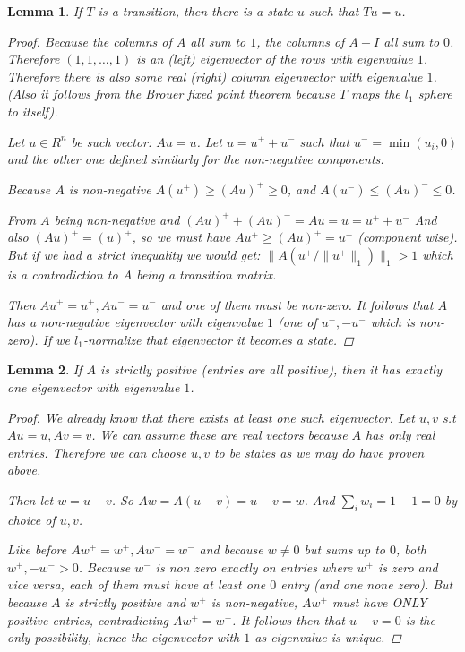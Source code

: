 \documentclass[a4paper,10pt]{article}
\theoremstyle{definition}
\theoremstyle{remark}
\theoremstyle{plain}
\newtheorem{lemma}{Lemma}[section]
\begin{document}
\begin{lemma}
\label{lem:exist1}
If $T$ is a transition, then
there is a state $u$ such that $Tu = u$.
\begin{proof}
Because the columns of $A$ all sum to $1$, the columns of $A-I$ all sum to $0$.
Therefore $(1,1, \dots, 1)$ is an (left) eigenvector of the rows with eigenvalue $1$.
Therefore there is also some real (right) column eigenvector with eigenvalue $1$. 
(Also it follows from the Brouer fixed point theorem because $T$ maps the $l_1$
sphere to itself).

Let $u \in R^n$ be such vector: $Au=u$. Let $u = u^+ + u^-$ such that $u^- =
\min(u_i,0)$ and the other one defined similarly for the non-negative components.

Because $A$ is non-negative $A(u^+) \geq (Au)^+ \geq 0$,
and $A(u^-) \leq (Au)^- \leq 0$.

From $A$ being
non-negative and $(Au)^+ + (Au)^- = Au = u = u^+ + u^-$
And also $(A u)^+ = (u)^+$, so we must have $Au^+ \geq (Au)^+ = u^+$ 
(component wise). But if we had a strict inequality we would get:
$\|A(u^+/\|u^+\|_1)\|_1 > 1$ which is a contradiction to $A$ being a transition
matrix.

Then $A u^+ = u^+, A u^- = u^-$ and one of them must be non-zero. It follows
that $A$ has a non-negative eigenvector with eigenvalue $1$ (one of $u^+, -u^-$
which is non-zero). If we $l_1$-normalize that eigenvector it becomes a state.
\end{proof}
\end{lemma}


\begin{lemma}
\label{lem:uniq1}
If $A$ is strictly positive (entries are all positive), then it has exactly
one eigenvector with eigenvalue $1$.

\begin{proof}
We already know that there exists at least one such eigenvector.
Let $u,v$ s.t $Au=u, Av=v$. 
We can assume these are real vectors because $A$ has only real entries.
Therefore we can choose $u,v$
to be states as we may do have proven above.

Then let $w=u-v$. So $Aw = A(u-v) = u-v = w$. 
And $\sum_i w_i = 1 - 1 = 0$ by choice of $u,v$.

Like before $Aw^+ = w^+, Aw^- = w^-$
and because $w \neq 0$ but sums up to $0$, both $w^+, -w^- > 0$.
Because $w^-$ is non zero exactly on entries where $w^+$ is zero and vice versa, 
each of them must have at least one $0$ entry (and one none zero). But because
$A$ is strictly positive and $w^+$ is non-negative, $Aw^+$ must have ONLY
positive entries, contradicting $Aw^+ = w^+$. It follows then that $u-v=0$ is
the only possibility, hence the eigenvector with $1$ as eigenvalue is unique.
\qedsymbol

\end{proof}
\end{lemma}
\end{document}
